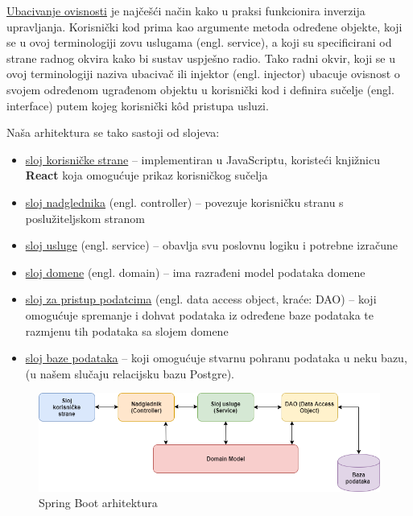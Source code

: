 	\underline{Ubacivanje ovisnosti} je najčešći način kako u praksi funkcionira inverzija upravljanja. Korisnički kod prima kao argumente metoda određene objekte, koji se u ovoj terminologiji zovu uslugama (engl. service), a koji su specificirani od strane radnog
	okvira kako bi sustav uspješno radio. Tako radni okvir, koji se u ovoj terminologiji
	naziva ubacivač ili injektor (engl. injector) ubacuje ovisnost o svojem određenom
	ugrađenom objektu u korisnički kod i definira sučelje (engl. interface) putem kojeg
	korisnički kôd pristupa usluzi. 
	
	\vspace{15pt} 
	
	Naša arhitektura se tako sastoji od slojeva:
	
	\begin{itemize}
		\item \underline{sloj korisničke strane} – implementiran u JavaScriptu, koristeći knjižnicu \textbf{React} koja omogućuje prikaz korisničkog sučelja
		\item \underline{sloj nadglednika} (engl. controller) – povezuje korisničku stranu s poslužiteljskom stranom
		\item \underline{sloj usluge} (engl. service) – obavlja svu poslovnu logiku i potrebne izračune
		\item \underline{sloj domene} (engl. domain) – ima razrađeni model podataka domene
		\item \underline{sloj za pristup podatcima} (engl. data access object, kraće: DAO) – koji
		omogućuje spremanje i dohvat podataka iz određene baze podataka te
		razmjenu tih podataka sa slojem domene
		\item \underline{sloj baze podataka} – koji omogućuje stvarnu pohranu podataka u neku bazu,(u našem slučaju relacijsku bazu Postgre). 
	\end{itemize} 

\vspace{15pt} 
\begin{figure}[H]
	\hspace*{-0.21in}
	\includegraphics[scale=0.7]{slike/novaArh.png} %
	\centering
	\caption{Spring Boot arhitektura}
	\label{fig:spring}
\end{figure}

